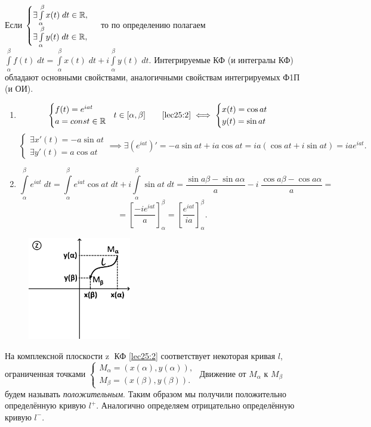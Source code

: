 \documentclass[../../main.tex]{subfiles}
\begin{document}
Если $\begin{cases}
	\exists \int\limits_{\alpha}^{\beta} x(t)\;dt  \in \mathbb{R}, \\
	\exists \int\limits_{\alpha}^{\beta} y(t)\;dt  \in \mathbb{R},
\end{cases}$ то по определению полагаем
$\int\limits_{\alpha}^{\beta} f(t)\;dt = 
\int\limits_{\alpha}^{\beta} x(t)\;dt + i\int\limits_{\alpha}^{\beta} 
y(t)\;dt$.
Интегрируемые КФ (и интегралы КФ) обладают
основными свойствами, аналогичными 
свойствам интегрируемых Ф1П (и ОИ).
\begin{exmps}

\;

\begin{enumerate}
\item\[\begin{cases}
	f(t) = e^{iat} \\
	a = const \in \mathbb{R}
\end{cases}\!\! t \in [\alpha, \beta]
\qquad
\eqref{lec25:2} \iff 
\begin{cases}
	x(t) = \cos{at} \\
	y(t) = \sin{at}
\end{cases}  
\]
\[\begin{cases}
	\exists x'(t) = -a\sin{at}  \\
	\exists y'(t) = a\cos{at}
\end{cases}\implies \exists \left(e^{iat} \right)' = -a\sin{at} + ia\cos{at} =
 ia(\cos{at} + i\sin{at}) = iae^{iat}.
\]
\item\[
\int\limits_{\alpha}^{\beta}e^{iat}\;dt =
\int\limits_{\alpha}^{\beta}e^{iat}\cos{at}\;dt +
 i\int\limits_{\alpha}^{\beta}\sin{at}\;dt = 
 \frac{\sin{a\beta} - \sin{a\alpha}}{a} -   
 i\ \frac{\cos{a\beta} - \cos{a\alpha}}{a} = \]\[
= \left[ \frac{-i{e}^{iat}}{a} \right]_{\alpha}^{\beta}= 
\left[ \frac{{e}^{iat}}{ia} \right]_{\alpha}^{\beta}.
\]
\end{enumerate}
\end{exmps}

\begin{figure}
\includegraphics[width=0.4\textwidth]{lec25_1.png}
\end{figure}
На комплексной плоскости \textcircled{z}  КФ \eqref{lec25:2} соответствует
некоторая кривая $l$, ограниченная точками $
\begin{cases}
	M_{\alpha} = (x(\alpha), y(\alpha)), \\
	M_{\beta} = (x(\beta), y(\beta)).
\end{cases} $ Движение от $M_{\alpha}$ к $M_{\beta}$ будем называть 
\emph{положительным}. Таким образом мы получили положительно
определённую кривую $l^+$. Аналогично определяем отрицательно
определённую кривую $l^-$.
\end{document}
